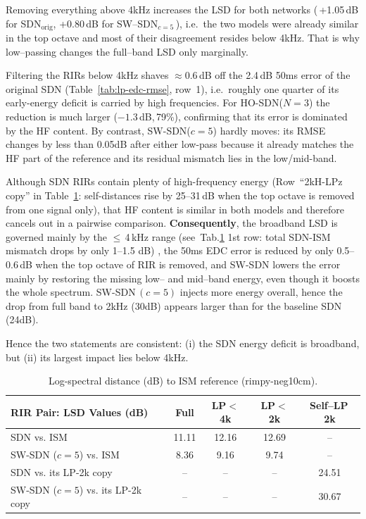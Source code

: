 \documentclass[journal]{IEEEtran}
\begin{document}
Removing everything above 4kHz increases the LSD for both
networks (\,+1.05\,dB for SDN\(_{\text{orig}}\), +0.80\,dB for
SW–SDN\(_{c=5}\)\,), i.e.\ the two models were already similar
in the top octave and most of their disagreement resides below
4kHz.  That is why low–passing changes the full–band LSD only marginally.

Filtering the RIRs below 4kHz shaves
$\approx\!0.6$\,dB off the 2.4\,dB 50ms error of the original SDN
(Table~\ref{tab:lp-edc-rmse}, row~1), i.e.\ roughly one quarter of its
early-energy deficit is carried by high frequencies.  For
HO-SDN(\(N\!=\!3\)) the reduction is much larger
(\(-1.3\)\,dB,\,79\%), confirming that its error is dominated by the HF content.  By contrast,
SW-SDN(\(c\!=\!5\)) hardly moves: its RMSE changes by less than
0.05{dB} after either low-pass because it already matches the HF
part of the reference and its residual mismatch lies in the
low/mid-band.

Although SDN RIRs contain plenty of high-frequency energy
(Row~“2kH-LPz copy” in Table~\ref{tab:lsd_bands}: self-distances rise by 25–31\,dB when the top octave is removed from one signal only), 
that HF content is similar in both models and
therefore cancels out in a pairwise comparison. \textbf{Consequently},
the broadband LSD is governed mainly by the \(\le\)\,4\,kHz
range (see~Tab.\ref{tab:lsd_bands} 1st row: total SDN-ISM mismatch drops by only 1–1.5 dB)
, the 50ms EDC error is reduced by only 0.5–0.6\,dB when
the top octave of RIR is removed, and SW-SDN lowers the
error mainly by restoring the missing low– and mid–band
energy, even though it boosts the whole spectrum. 
SW-SDN\,$(c\!=\!5)$ injects more energy overall, hence the drop from full band to 2kHz (30dB) appears larger than for the baseline SDN (24dB).

Hence the two statements are consistent:  
(i) the SDN energy deficit is broadband, but (ii) its
largest impact lies below 4{kHz}.

\begin{table}[h]
  \centering
  \footnotesize
  \caption{Log-spectral distance (dB) to ISM reference (rimpy-neg10cm).}
  \label{tab:lsd_bands}
  \renewcommand{\arraystretch}{1.15}
  \begin{tabular}{l@{\hskip 4pt}c@{\hskip 5pt}c@{\hskip 5pt}c@{\hskip 5pt}c}
    \toprule
    \textbf{RIR Pair: LSD Values (dB)} & \textbf{Full} & \textbf{LP$<$4k} & \textbf{LP$<$2k} & \textbf{Self–LP\,2k} \\
    \midrule
    SDN vs. ISM & 11.11 & 12.16 & 12.69 & -- \\
    SW-SDN ($c{=}5$) vs. ISM & 8.36 & 9.16 & 9.74 & -- \\
    SDN vs. its LP-2k copy & -- & -- & -- & 24.51 \\
    SW-SDN ($c{=}5$) vs. its LP-2k copy & -- & -- & -- & 30.67 \\
    \bottomrule
  \end{tabular}
\end{table}
\end{document}
